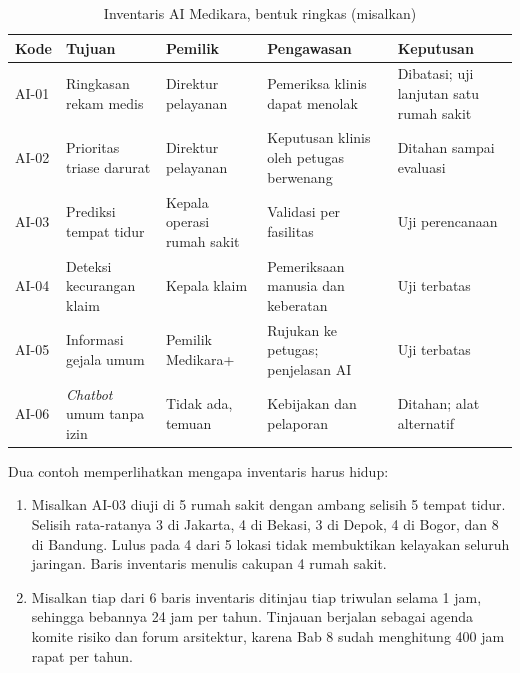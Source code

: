\begin{table}[!htb]
  \centering\footnotesize
  \caption{Inventaris AI Medikara, bentuk ringkas (misalkan)}\label{tab:ch11-inventaris}
  \begin{tabularx}{\textwidth}{|>{\raggedright\arraybackslash}p{}|>{\raggedright\arraybackslash}X|>{\raggedright\arraybackslash}p{}|>{\raggedright\arraybackslash}X|>{\raggedright\arraybackslash}p{}|}
    \hline
    \textbf{Kode} & \textbf{Tujuan} & \textbf{Pemilik} & \textbf{Pengawasan} & \textbf{Keputusan} \\
    \hline
    AI-01 & Ringkasan rekam medis & Direktur pelayanan & Pemeriksa klinis dapat menolak & Dibatasi;
    uji lanjutan satu rumah sakit \\ \hline
    AI-02 & Prioritas triase darurat & Direktur pelayanan & Keputusan klinis oleh petugas berwenang
    & Ditahan sampai evaluasi \\ \hline
    AI-03 & Prediksi tempat tidur & Kepala operasi rumah sakit & Validasi per fasilitas & Uji
    perencanaan \\ \hline
    AI-04 & Deteksi kecurangan klaim & Kepala klaim & Pemeriksaan manusia dan keberatan & Uji
    terbatas \\ \hline
    AI-05 & Informasi gejala umum & Pemilik Medikara+ & Rujukan ke petugas; penjelasan AI & Uji
    terbatas \\ \hline
    AI-06 & \textit{Chatbot} umum tanpa izin & Tidak ada, temuan & Kebijakan dan pelaporan &
    Ditahan; alat alternatif \\ \hline
  \end{tabularx}
\end{table}

Dua contoh memperlihatkan mengapa inventaris harus hidup:
\begin{enumerate}
  \item Misalkan AI-03 diuji di 5 rumah sakit dengan ambang selisih 5 tempat tidur. Selisih
  rata-ratanya 3 di Jakarta, 4 di Bekasi, 3 di Depok, 4 di Bogor, dan 8 di Bandung. Lulus pada 4
  dari 5 lokasi tidak membuktikan kelayakan seluruh jaringan. Baris inventaris menulis cakupan 4
  rumah sakit.
  \item Misalkan tiap dari 6 baris inventaris ditinjau tiap triwulan selama 1 jam, sehingga bebannya
  24 jam per tahun. Tinjauan berjalan sebagai agenda komite risiko dan forum arsitektur, karena Bab
  8 sudah menghitung 400 jam rapat per tahun.
\end{enumerate}

